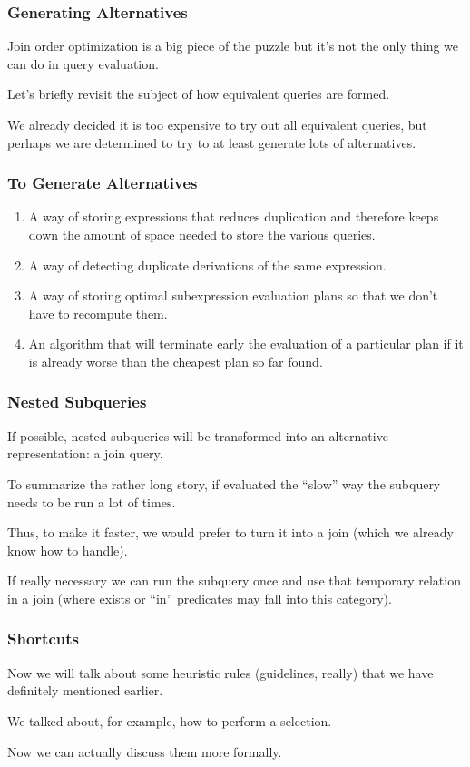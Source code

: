 \begin{frame}
\frametitle{Generating Alternatives}

Join order optimization is a big piece of the puzzle but it's not the only thing we can do in query evaluation. 

Let's briefly revisit the subject of how equivalent queries are formed. 

We already decided it is too expensive to try out all equivalent queries, but perhaps we are determined to try to at least generate lots of alternatives.

\end{frame}

\begin{frame}
\frametitle{To Generate Alternatives}

\begin{enumerate}
	\item A way of storing expressions that reduces duplication and therefore keeps down the amount of space needed to store the various queries.
	\item A way of detecting duplicate derivations of the same expression.
	\item A way of storing optimal subexpression evaluation plans so that we don't have to recompute them.
	\item An algorithm that will terminate early the evaluation of a particular plan if it is already worse than the cheapest plan so far found. 
\end{enumerate}


\end{frame}


\begin{frame}
\frametitle{Nested Subqueries}

If possible, nested subqueries will be transformed into an alternative representation: a join query. 

To summarize the rather long story, if evaluated the ``slow'' way the subquery needs to be run a lot of times. 

Thus, to make it faster, we would prefer to turn it into a join (which we already know how to handle).

If really necessary we can run the subquery once and use that temporary relation in a join (where exists or ``in'' predicates may fall into this category).


\end{frame}

\begin{frame}
\frametitle{Shortcuts}

Now we will talk about some heuristic rules (guidelines, really) that we have definitely mentioned earlier.

We talked about, for example, how to perform a selection. 

Now we can actually discuss them more formally.

\end{frame}

